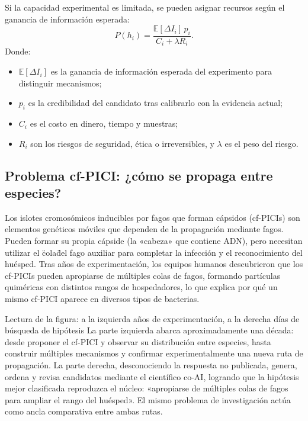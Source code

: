 Si la capacidad experimental es limitada, se pueden asignar recursos según el ganancia de información esperada:
$$
P(h_i)=\frac{\mathbb{E}[\Delta I_i]\,p_i}
{C_i+\lambda R_i}.
$$
Donde:
\begin{itemize}
  \item $\mathbb{E}[\Delta I_i]$ es la ganancia de información esperada del experimento para distinguir mecanismos;
  \item $p_i$ es la credibilidad del candidato tras calibrarlo con la evidencia actual;
  \item $C_i$ es el costo en dinero, tiempo y muestras;
  \item $R_i$ son los riesgos de seguridad, ética o irreversibles, y $\lambda$ es el peso del riesgo.
\end{itemize}


\subsection{Problema cf-PICI: ¿cómo se propaga entre especies?}

Los islotes cromosómicos inducibles por fagos que forman cápsidos (cf-PICIs) son elementos genéticos móviles que dependen de la propagación mediante fagos. Pueden formar su propia cápside (la «cabeza» que contiene ADN), pero necesitan utilizar el \"cola\" del fago auxiliar para completar la infección y el reconocimiento del huésped. Tras años de experimentación, los equipos humanos descubrieron que los cf-PICIs pueden apropiarse de múltiples colas de fagos, formando partículas quiméricas con distintos rangos de hospedadores, lo que explica por qué un mismo cf-PICI aparece en diversos tipos de bacterias.


\begin{knowledgebox}{Lectura de la figura: a la izquierda años de experimentación, a la derecha días de búsqueda de hipótesis}
La parte izquierda abarca aproximadamente una década: desde proponer el cf-PICI y observar su distribución entre especies, hasta construir múltiples mecanismos y confirmar experimentalmente una nueva ruta de propagación. La parte derecha, desconociendo la respuesta no publicada, genera, ordena y revisa candidatos mediante el científico co-AI, logrando que la hipótesis mejor clasificada reproduzca el núcleo: «apropiarse de múltiples colas de fagos para ampliar el rango del huésped». El mismo problema de investigación actúa como ancla comparativa entre ambas rutas.
\end{knowledgebox}

